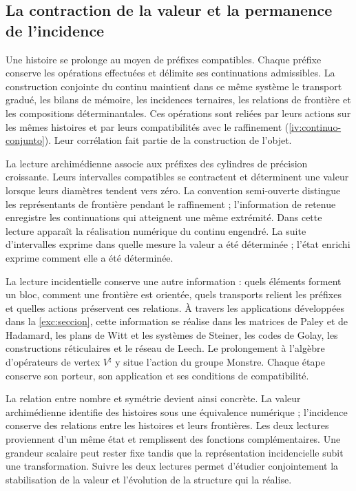 \subsection*{La contraction de la valeur et la permanence de l’incidence}
\label{libnar:continuo}

Une histoire se prolonge au moyen de préfixes compatibles. Chaque préfixe
conserve les opérations effectuées et délimite ses continuations
admissibles. La construction conjointe du continu maintient dans ce même
système le transport gradué, les bilans de mémoire, les incidences
ternaires, les relations de frontière et les compositions
déterminantales. Ces opérations sont reliées par leurs actions sur
les mêmes histoires et par leurs compatibilités avec le raffinement
(\cref{iv:continuo-conjunto}). Leur corrélation fait partie de
la construction de l’objet.

La lecture archimédienne associe aux préfixes des cylindres de précision croissante. Leurs intervalles compatibles se contractent et déterminent une valeur lorsque leurs diamètres tendent vers zéro. La convention semi-ouverte distingue les représentants de frontière pendant le raffinement ; l'information de retenue enregistre les continuations qui atteignent une même extrémité. Dans cette lecture apparaît la réalisation numérique du continu engendré. La suite d'intervalles exprime dans quelle mesure la valeur a été déterminée ; l'état enrichi exprime comment elle a été déterminée.

La lecture incidentielle conserve une autre information : quels éléments forment
un bloc, comment une frontière est orientée, quels transports relient les
préfixes et quelles actions préservent ces relations. À travers les applications
développées dans la \cref{exc:seccion}, cette information se réalise dans
les matrices de Paley et de Hadamard, les plans de Witt et les systèmes de Steiner,
les codes de Golay, les constructions réticulaires et le réseau de Leech.
Le prolongement à l’algèbre d’opérateurs de vertex \(V^\natural\)
y situe l’action du groupe Monstre. Chaque étape conserve son porteur,
son application et ses conditions de compatibilité.

La relation entre nombre et symétrie devient ainsi concrète. La valeur
archimédienne identifie des histoires sous une équivalence numérique ;
l’incidence conserve des relations entre les histoires et leurs frontières.
Les deux lectures proviennent d’un même état et remplissent des fonctions
complémentaires. Une grandeur scalaire peut rester fixe tandis que
la représentation incidencielle subit une transformation. Suivre
les deux lectures permet d’étudier conjointement la stabilisation de la
valeur et l’évolution de la structure qui la réalise.

